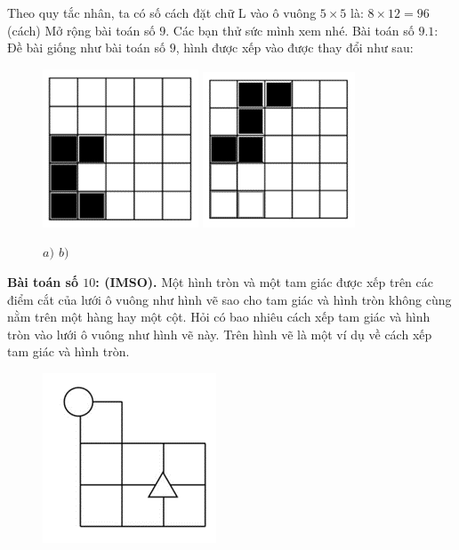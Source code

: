\begin{multicols}{2}
\begin{figure}[H]
			\vspace*{-15pt}
		\end{figure}
		Theo quy tắc nhân, ta có số cách đặt chữ L vào ô vuông $5\times 5$ là: $8\times12=96$ (cách)
	\vskip 0.1cm
	Mở rộng bài toán số $9$. Các bạn thử sức mình xem nhé.
	\vskip 0.1cm
	Bài toán số $9.1$: Đề bài giống như bài toán số $9$, hình được xếp vào được thay đổi như sau:
	\begin{figure}[H]
		\centering
		\vspace*{-5pt}
		\captionsetup{labelformat=empty, justification=centering}
		\includegraphics[height=0.4\linewidth]{_16}\quad
		\includegraphics[height=0.4\linewidth]{_17}
		\caption{\small\textit{$a)$ \hspace*{100pt} $b)$}}
		\vspace*{-15pt}
	\end{figure}
	\textbf{\color{toancuabi}Bài toán số $10$: (IMSO).}
	\vskip 0.1cm
	Một hình tròn và một tam giác được xếp trên các điểm cắt của lưới ô vuông như hình vẽ sao cho tam giác và hình tròn không cùng nằm trên một hàng hay một cột.
	\vskip 0.1cm
		Hỏi có bao nhiêu cách xếp tam giác và hình tròn vào lưới ô vuông như hình vẽ này. Trên hình vẽ là một ví dụ về cách xếp tam giác và hình tròn.
		\begin{figure}[H]
			\centering
			\vspace*{-10pt}
			\captionsetup{labelformat=empty, justification=centering}
			\includegraphics[width=0.4\linewidth]{_18}

\end{figure}
\end{multicols}
